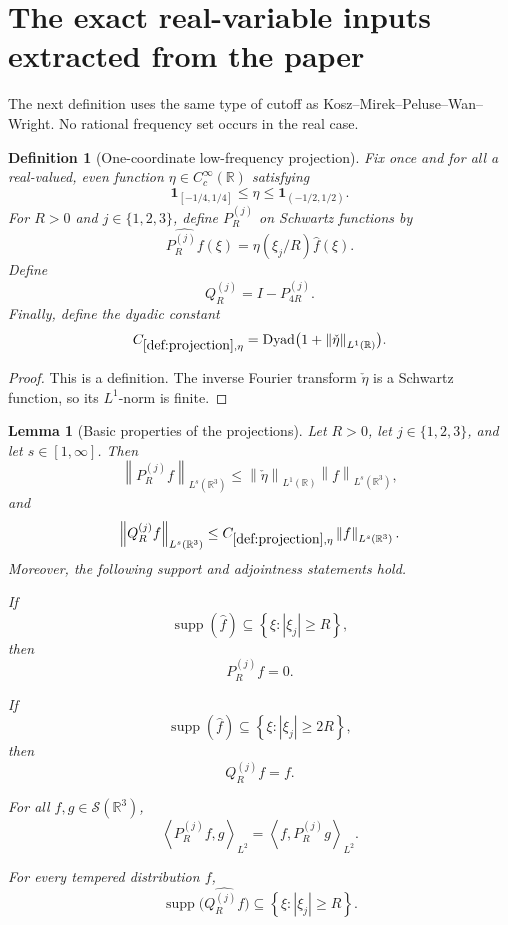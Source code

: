 \documentclass[11pt]{article}
\newtheorem{lemma}[theorem]{Lemma}
\newtheorem{definition}[theorem]{Definition}
\newcommand{\R}{\mathbb{R}}
\newcommand{\Sch}{\mathcal{S}}
\newcommand{\supp}{\operatorname{supp}}
\newcommand{\Dyad}{\operatorname{Dyad}}
\newcommand{\one}{\mathbf{1}}
\newcommand{\ip}[2]{\left\langle #1,#2\right\rangle}
\newcommand{\norm}[2]{\left\lVert #1\right\rVert_{#2}}
\newcommand{\Cst}[2]{C_{\ref{#1},#2}}
\newcommand{\abs}[1]{\left|#1\right|}
\newcommand{\set}[1]{\left\{#1\right\}}
\newcommand{\indices}{\{1,2,3\}}
\begin{document}
	\section{The exact real-variable inputs extracted from the paper}
	
	The next definition uses the same type of cutoff as Kosz--Mirek--Peluse--Wan--Wright.  No rational frequency set occurs in the real case.
	
	\begin{definition}[One-coordinate low-frequency projection]\label{def:projection}
		Fix once and for all a real-valued, even function \(\eta\in C_c^\infty(\R)\) satisfying
		\[
		\one_{[-1/4,1/4]}\leq\eta\leq\one_{(-1/2,1/2)}.
		\]
		For \(R>0\) and \(j\in\indices\), define \(P_R^{(j)}\) on Schwartz functions by
		\[
		\widehat{P_R^{(j)}f}(\xi)=\eta(\xi_j/R)\widehat f(\xi).
		\]
		Define
		\[
		Q_R^{(j)}=I-P_{4R}^{(j)}.
		\]
		Finally, define the dyadic constant
		\[
		\Cst{def:projection}{\eta}=\Dyad\bigl(1+\norm{\check\eta}{L^1(\R)}\bigr).
		\]
	\end{definition}
	
	\begin{proof}
		This is a definition.  The inverse Fourier transform \(\check\eta\) is a Schwartz function, so its \(L^1\)-norm is finite.
	\end{proof}
	
	\begin{lemma}[Basic properties of the projections]\label{lem:projection-properties}
		Let \(R>0\), let \(j\in\indices\), and let \(s\in[1,\infty]\).  Then
		\[
		\norm{P_R^{(j)}f}{L^s(\R^3)}
		\leq
		\norm{\check\eta}{L^1(\R)}\norm{f}{L^s(\R^3)},
		\]
		and
		\[
		\norm{Q_R^{(j)}f}{L^s(\R^3)}
		\leq
		\Cst{def:projection}{\eta}\norm{f}{L^s(\R^3)}.
		\]
		Moreover, the following support and adjointness statements hold.
		
		If
		\[
		\supp(\widehat f)\subseteq\set{\xi:\abs{\xi_j}\geq R},
		\]
		then
		\[
		P_R^{(j)}f=0.
		\]
		
		If
		\[
		\supp(\widehat f)\subseteq\set{\xi:\abs{\xi_j}\geq2R},
		\]
		then
		\[
		Q_R^{(j)}f=f.
		\]
		
		For all \(f,g\in\Sch(\R^3)\),
		\[
		\ip{P_R^{(j)}f}{g}_{L^2}
		=
		\ip{f}{P_R^{(j)}g}_{L^2}.
		\]
		
		For every tempered distribution \(f\),
		\[
		\supp\bigl(\widehat{Q_R^{(j)}f}\bigr)
		\subseteq
		\set{\xi:\abs{\xi_j}\geq R}.
		\]
	\end{lemma}
	
\end{document}
